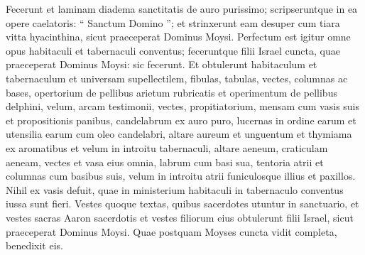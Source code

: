 \begin{biblechapter}
\begin{biblechapter}
\begin{biblechapter}
\begin{biblechapter}
\begin{biblechapter}
\begin{biblechapter}
\begin{biblechapter}
\begin{biblechapter}
\begin{biblechapter}
\begin{biblechapter}
\begin{biblechapter}
\begin{biblechapter}
\begin{biblechapter}
\begin{biblechapter}
\begin{biblechapter}
\begin{biblechapter}
\begin{biblechapter}
\begin{biblechapter}
\begin{biblechapter}
\begin{biblechapter}
\begin{biblechapter}
\begin{biblechapter}
\begin{biblechapter}
\begin{biblechapter}
\begin{biblechapter}
\begin{biblechapter}
\begin{biblechapter}
\begin{biblechapter}
\begin{biblechapter}
\begin{biblechapter}
\begin{biblechapter}
\begin{biblechapter}
\begin{biblechapter}
\begin{biblechapter}
\begin{biblechapter}
\begin{biblechapter}
\begin{biblechapter}
\begin{biblechapter}
\begin{biblechapter}
 \verse Fecerunt et laminam diadema sanctitatis de auro purissimo; scripseruntque in ea opere caelatoris: “ Sanctum Domino ”; 
\verse et strinxerunt eam desuper cum tiara vitta hyacinthina, sicut praeceperat Dominus Moysi.
 \verse Perfectum est igitur omne opus habitaculi et tabernaculi conventus; feceruntque filii Israel cuncta, quae praeceperat Dominus Moysi: sic fecerunt.
 \verse Et obtulerunt habitaculum et tabernaculum et universam supellectilem, fibulas, tabulas, vectes, columnas ac bases, 
\verse opertorium de pellibus arietum rubricatis et operimentum de pellibus delphini, velum, 
\verse arcam testimonii, vectes, propitiatorium, 
\verse mensam cum vasis suis et propositionis panibus, 
\verse candelabrum ex auro puro, lucernas in ordine earum et utensilia earum cum oleo candelabri, 
\verse altare aureum et unguentum et thymiama ex aromatibus et velum in introitu tabernaculi, 
\verse altare aeneum, craticulam aeneam, vectes et vasa eius omnia, labrum cum basi sua, 
\verse tentoria atrii et columnas cum basibus suis, velum in introitu atrii funiculosque illius et paxillos. Nihil ex vasis defuit, quae in ministerium habitaculi in tabernaculo conventus iussa sunt fieri. 
\verse Vestes quoque textas, quibus sacerdotes utuntur in sanctuario, et vestes sacras Aaron sacerdotis et vestes filiorum eius 
\verse obtulerunt filii Israel, sicut praeceperat Dominus Moysi.
 \verse Quae postquam Moyses cuncta vidit completa, benedixit eis.
 

\end{biblechapter}
\end{biblechapter}
\end{biblechapter}
\end{biblechapter}
\end{biblechapter}
\end{biblechapter}
\end{biblechapter}
\end{biblechapter}
\end{biblechapter}
\end{biblechapter}
\end{biblechapter}
\end{biblechapter}
\end{biblechapter}
\end{biblechapter}
\end{biblechapter}
\end{biblechapter}
\end{biblechapter}
\end{biblechapter}
\end{biblechapter}
\end{biblechapter}
\end{biblechapter}
\end{biblechapter}
\end{biblechapter}
\end{biblechapter}
\end{biblechapter}
\end{biblechapter}
\end{biblechapter}
\end{biblechapter}
\end{biblechapter}
\end{biblechapter}
\end{biblechapter}
\end{biblechapter}
\end{biblechapter}
\end{biblechapter}
\end{biblechapter}
\end{biblechapter}
\end{biblechapter}
\end{biblechapter}
\end{biblechapter}

